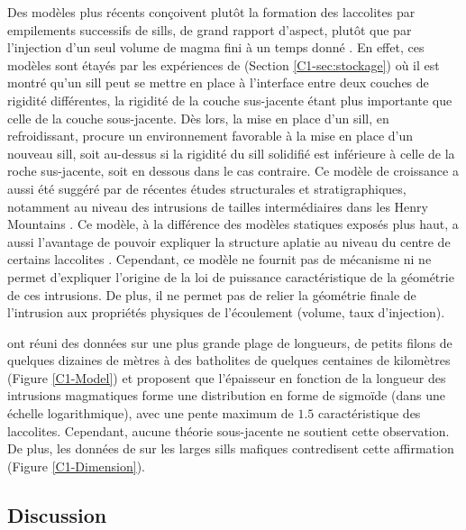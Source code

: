 Des modèles plus récents conçoivent plutôt la formation des laccolites
par empilements successifs de sills, de grand rapport d'aspect, plutôt
que par  l'injection d'un seul volume  de magma fini à  un temps donné
\citep{Menand:2011ki}.   En effet,  ces  modèles sont  étayés par  les
expériences de \citet{Kavanagh:2006ig} (Section \ref{C1-sec:stockage})
où il  est montré  qu'un sill  peut se mettre  en place  à l'interface
entre deux couches  de rigidité différentes, la rigidité  de la couche
sus-jacente   étant   plus  importante   que   celle   de  la   couche
sous-jacente. Dès lors, la mise  en place d'un sill, en refroidissant,
procure un  environnement favorable  à la mise  en place  d'un nouveau
sill, soit au-dessus si la rigidité du sill solidifié est inférieure à
celle  de  la   roche  sus-jacente,  soit  en  dessous   dans  le  cas
contraire. Ce modèle de croissance a aussi été suggéré par de récentes
études  structurales  et  stratigraphiques, notamment  au  niveau  des
intrusions  de   tailles  intermédiaires  dans  les   Henry  Mountains
\citep{Horsman:2005ct,Morgan:2008hj,Horsman:2009gea,Menand:2011ki}. Ce
modèle, à  la différence  des modèles statiques  exposés plus  haut, a
aussi l'avantage de  pouvoir expliquer la structure  aplatie au niveau
du centre de certains laccolites \citep{Morgan:2008hj}.  Cependant, ce
modèle ne fournit pas de  mécanisme ni ne permet d'expliquer l'origine
de  la  loi  de  puissance  caractéristique de  la  géométrie  de  ces
intrusions. De plus, il ne permet pas de relier la géométrie finale de
l'intrusion  aux propriétés  physiques de  l'écoulement (volume,  taux
d'injection).

\citet{Nachwuchskoechin:2002tv}  ont réuni  des  données  sur une  plus
grande plage  de longueurs, de  petits filons de quelques  dizaines de
mètres à  des batholites de  quelques centaines de  kilomètres (Figure
\ref{C1-Model})  et  proposent  que  l'épaisseur  en  fonction  de  la
longueur des intrusions magmatiques forme une distribution en forme de
sigmoïde (dans une  échelle logarithmique), avec une  pente maximum de
$1.5$  caractéristique  des  laccolites.  Cependant,  aucune  théorie
sous-jacente ne soutient  cette observation.  De plus,  les données de
\citet{Cruden:tg}  sur les  larges sills  mafiques contredisent  cette
affirmation (Figure \ref{C1-Dimension}).

\subsection{Discussion}
\label{C1-sec:conclusion}


